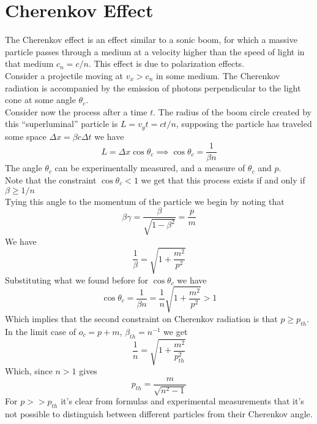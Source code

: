 \documentclass[../qm.tex]{subfiles}
\begin{document}
\section{Cherenkov Effect}
The Cherenkov effect is an effect similar to a sonic boom, for which a massive particle passes through a medium at a velocity higher than the speed of light in that medium $c_n=c/n$. This effect is due to polarization effects.\\
Consider a projectile moving at $v_x>c_n$ in some medium. The Cherenkov radiation is accompanied by the emission of photons perpendicular to the light cone at some angle $\theta_c$.\\
Consider now the process after a time $t$. The radius of the boom circle created by this ``superluminal'' particle is $L=v_yt=ct/n$, supposing the particle has traveled some space $\Delta x=\beta c\Delta t$ we have
\begin{equation}
	L=\Delta x\cos\theta_c\implies\cos\theta_c=\frac{1}{\beta n}
	\label{eq:cherenkovangle}
\end{equation}
The angle $\theta_c$ can be experimentally measured, and a measure of $\theta_c$ and $p$.\\
Note that the constraint $\cos\theta_c<1$ we get that this process exists if and only if $\beta\ge1/n$\\
Tying this angle to the momentum of the particle we begin by noting that
\begin{equation*}
	\beta\gamma=\frac{\beta}{\sqrt{1-\beta^2}}=\frac{p}{m}
\end{equation*}
We have
\begin{equation*}
	\frac{1}{\beta}=\sqrt{1+\frac{m^2}{p^2}}
\end{equation*}
Substituting what we found before for $\cos\theta_c$ we have
\begin{equation}
	\cos\theta_c=\frac{1}{\beta n}=\frac{1}{n}\sqrt{1+\frac{m^2}{p^2}}>1
	\label{eq:cherenkovmom}
\end{equation}
Which implies that the second constraint on Cherenkov radiation is that $p\ge p_{th}$. In the limit case of $o_c=p+m$, $\beta_{th}=n^{-1}$ we get
\begin{equation*}
	\frac{1}{n}=\sqrt{1+\frac{m^2}{p_{th}^2}}
\end{equation*}
Which, since $n>1$ gives
\begin{equation}
	p_{th}=\frac{m}{\sqrt{n^2-1}}
	\label{eq:ptreshcherenkov}
\end{equation}
For $p>>p_{th}$ it's clear from formulas and experimental measurements that it's not possible to distinguish between different particles from their Cherenkov angle.\\
\end{document}
